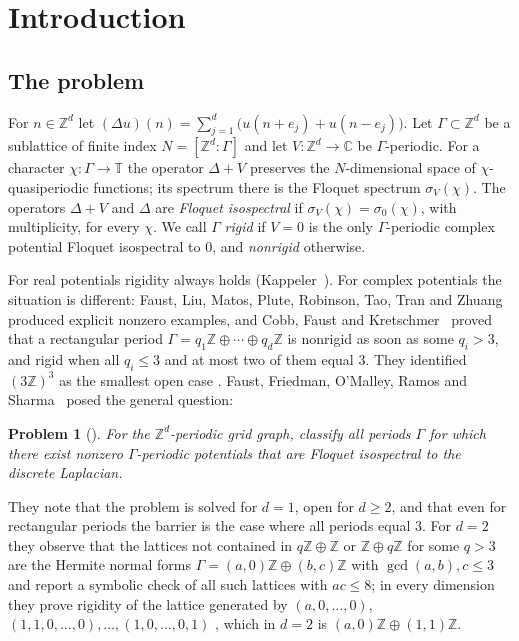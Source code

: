 \documentclass[11pt,reqno]{amsart}
\newtheorem{problem}[theorem]{Problem}
\theoremstyle{definition}
\theoremstyle{remark}
\newcommand{\C}{\mathbb C}
\newcommand{\Z}{\mathbb Z}
\newcommand{\T}{\mathbb T}
\begin{document}
\maketitle

\tableofcontents

\section{Introduction}\label{sec:intro}

\subsection{The problem}
For $n\in\Z^d$ let $(\Delta u)(n)=\sum_{j=1}^{d}\bigl(u(n+e_j)+u(n-e_j)\bigr)$.
Let $\Gamma\subset\Z^d$ be a sublattice of finite index $N=[\Z^d:\Gamma]$ and
let $V\colon\Z^d\to\C$ be $\Gamma$-periodic.  For a character
$\chi\colon\Gamma\to\T$ the operator $\Delta+V$ preserves the $N$-dimensional
space of $\chi$-quasiperiodic functions; its spectrum there is the Floquet
spectrum $\sigma_V(\chi)$.  The operators $\Delta+V$ and $\Delta$ are
\emph{Floquet isospectral} if $\sigma_V(\chi)=\sigma_0(\chi)$, with
multiplicity, for every $\chi$.  We call $\Gamma$ \emph{rigid} if $V=0$ is the
only $\Gamma$-periodic complex potential Floquet isospectral to $0$, and
\emph{nonrigid} otherwise.

For real potentials rigidity always holds (Kappeler~\cite{Kappeler1989}).  For
complex potentials the situation is different: Faust, Liu, Matos, Plute,
Robinson, Tao, Tran and Zhuang~\cite{FaustEtAl2024} produced explicit nonzero
examples, and Cobb, Faust and Kretschmer~\cite[Theorem~C]{CFK2026} proved that a
rectangular period $\Gamma=q_1\Z\oplus\cdots\oplus q_d\Z$ is nonrigid as soon as
some $q_i>3$, and rigid when all $q_i\le3$ and at most two of them equal $3$.
They identified $(3\Z)^3$ as the smallest open case \cite[Section~4.4]{CFK2026}.
Faust, Friedman, O'Malley, Ramos and Sharma~\cite{FFORS2026} posed the general
question:

\begin{problem}[{\cite[Problem~1]{FFORS2026}}]\label{prob:FFORS}
For the $\Z^d$-periodic grid graph, classify all periods $\Gamma$ for which
there exist nonzero $\Gamma$-periodic potentials that are Floquet isospectral to
the discrete Laplacian.
\end{problem}

They note that the problem is solved for $d=1$, open for $d\ge2$, and that
even for rectangular periods the barrier is the case where all periods equal
$3$.  For $d=2$ they observe that the lattices not contained in $q\Z\oplus\Z$
or $\Z\oplus q\Z$ for some $q>3$ are the Hermite normal forms
$\Gamma=(a,0)\Z\oplus(b,c)\Z$ with $\gcd(a,b),c\le3$ and report a symbolic check
of all such lattices with $ac\le8$; in every dimension they prove rigidity of
the lattice generated by $(a,0,\dots,0)$, $(1,1,0,\dots,0),\dots,(1,0,\dots,0,1)$
\cite[Theorem~6.1]{FFORS2026}, which in $d=2$ is $(a,0)\Z\oplus(1,1)\Z$.
\end{document}
